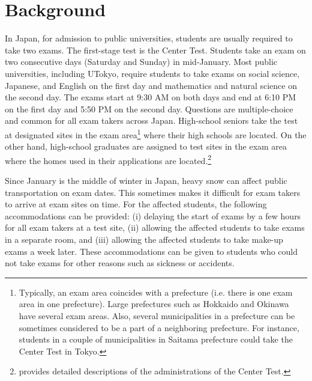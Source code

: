 \documentclass[12pt,letterpaper]{article}
\begin{document}
\clearpage



\appendix

\section{Background}\label{sec:background}

In Japan, for admission to public universities, students are usually required to take two exams.
The first-stage test is the Center Test.
Students take an exam on two consecutive days (Saturday and Sunday) in mid-January.
Most public universities, including UTokyo, require students to take exams on social science, Japanese, and English on the first day and mathematics and natural science on the second day.
The exams start at 9:30 AM on both days and end at 6:10 PM on the first day and 5:50 PM on the second day.
Questions are multiple-choice and common for all exam takers across Japan.
High-school seniors take the test at designated sites in the exam area\footnote{ \label{footnote:prefecture}
  Typically, an exam area coincides with a prefecture (i.e. there is one exam area in one prefecture).
  Large prefectures such as Hokkaido and Okinawa have several exam areas.
  Also, several municipalities in a prefecture can be sometimes considered to be a part of a neighboring prefecture.
  For instance, students in a couple of municipalities in Saitama prefecture could take the Center Test in Tokyo.
} where their high schools are located.
On the other hand, high-school graduates are assigned to test sites in the exam area where the homes used in their applications are located.\footnote{
  \citet{Watanabe2013} provides detailed descriptions of the administrations of the Center Test.
}

Since January is the middle of winter in Japan, heavy snow can affect public transportation on exam dates.
This sometimes makes it difficult for exam takers to arrive at exam sites on time.
For the affected students, the following accommodations can be provided:
(i) delaying the start of exams by a few hours for all exam takers at a test site,
(ii) allowing the affected students to take exams in a separate room, and
(iii) allowing the affected students to take make-up exams a week later.
These accommodations can be given to students who could not take exams for other reasons such as sickness or accidents.
\end{document}

